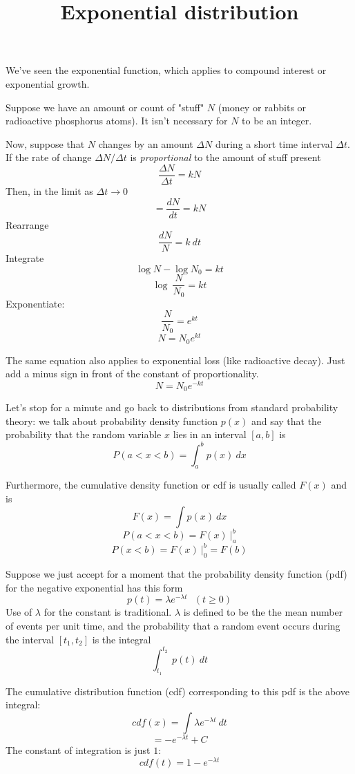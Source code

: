 \documentclass[11pt, oneside]{article}
\title{Exponential distribution}
\date{}
\begin{document}
\maketitle
\Large

\label{sec:Exponential_distribution}
We've seen the exponential function, which applies to compound interest or exponential growth.  

Suppose we have an amount or count of "stuff" $N$ (money or rabbits or radioactive phosphorus atoms).  It isn't necessary for $N$ to be an integer.

Now, suppose that $N$ changes by an amount $\Delta N$ during a short time interval $\Delta t$.  If the rate of change $\Delta N/\Delta t$ is \emph{proportional} to the amount of stuff present 
\[ \frac{\Delta N}{\Delta t} = k N \]
Then, in the limit as $\Delta t \rightarrow 0$
\[ = \frac{dN}{dt} = k N \]
Rearrange
\[ \frac{dN}{N} = k \ dt \]
Integrate
\[ \log N - \log N_0 =  kt \]
\[ \log \ \frac{N}{N_0} =  kt \]
Exponentiate:
\[ \frac{N}{N_0} = e^{kt} \]
\[ N = N_0 e^{kt} \]

The same equation also applies to exponential loss (like radioactive decay).  Just add a minus sign in front of the constant of proportionality.
\[ N = N_0 e^{-kt} \]

Let's stop for a minute and go back to distributions from standard probability theory:   we talk about probability density function $p(x)$ and say that the probability that the random variable $x$ lies in an interval $[a,b]$ is
\[ P(a < x < b) = \int_a^b p(x) \ dx \]

Furthermore, the cumulative density function or cdf is usually called $F(x)$ and is
\[ F(x) = \int p(x) \ dx \]
\[ P(a < x < b) = F(x) \ \bigg |_a^b \]
\[ P( x < b) = F(x) \ \bigg |_0^b = F(b) \]

Suppose we just accept for a moment that the probability density function (pdf) for the negative exponential has this form
\[ p(t) = \lambda e^{-\lambda t} \ \ \ (t \ge 0) \]
Use of $\lambda$ for the constant is traditional.  $\lambda$ is defined to be the the mean number of events per unit time, and the probability that a random event occurs during the interval $[t_1,t_2]$ is the integral
\[ \int_{t_1}^{t_2} \ p(t) \ dt \]

The cumulative distribution function (cdf) corresponding to this pdf is the above integral:
\[ cdf(x) = \int \lambda e^{-\lambda t} \ dt \]
\[ =  - e^{-\lambda t} + C \]
The constant of integration is just $1$:
\[ cdf(t) = 1 - e^{-\lambda t} \]
\end{document}
